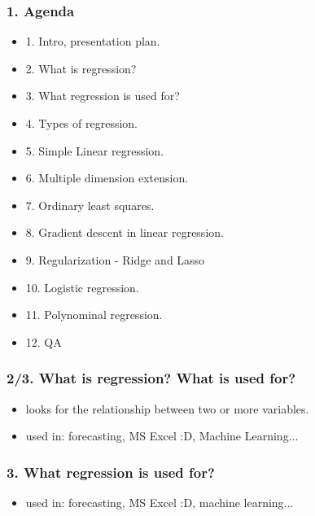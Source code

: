 \documentclass[handout,compress]{beamer} %
\begin{document}
\renewcommand{\logosinfootline}{\raisebox{0.12cm}{\begin{beamercolorbox}{rafi}{Seminar \quad Overview regression methods \hfill \insertframenumber/\inserttotalframenumber}\end{beamercolorbox}}}
\begin{frame}[allowframebreaks]
	\frametitle{1. Agenda}
    \begin{itemize}
    \item 1. Intro, presentation plan.
    \item 2. What is regression?
    \item 3. What regression is used for?
    \item 4. Types of regression.
    \item 5. Simple Linear regression.
    \item 6. Multiple dimension extension.
    \item 7. Ordinary least squares.
    \item 8. Gradient descent in linear regression.
    \item 9. Regularization - Ridge and Lasso
    \item 10. Logistic regression.
    \item 11. Polynominal regression.
    \item 12. QA
	\end{itemize}
\end{frame}
\begin{frame}
	\frametitle{2/3. What is regression? What is used for?}
	\begin{itemize}
	\item looks for the relationship between two or more variables.
	\item used in: forecasting, MS Excel :D, Machine Learning...
\end{itemize}		
\end{frame}
\begin{frame}
	\frametitle{3. What regression is used for?}	
	\begin{itemize}
	\item used in: forecasting, MS Excel :D, machine learning...
	\end{itemize}
\end{frame}
\end{document}

